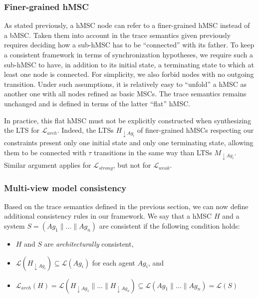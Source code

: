 \subsubsection*{Finer-grained hMSC}

As stated previously, a hMSC node can refer to a finer-grained hMSC instead of a bMSC. Taken them into account in the trace semantics given previously requires deciding how a sub-hMSC has to be ``connected'' with its father. To keep a consistent framework in terms of synchronization hypotheses, we require such a sub-hMSC to have, in addition to its initial state, a terminating state to which at least one node is connected. For simplicity, we also forbid nodes with no outgoing transition. Under such assumptions, it is relatively easy to ``unfold'' a hMSC as another one with all nodes refined as basic MSCs. The trace semantics remains unchanged and is defined in terms of the latter ``flat'' hMSC. 

In practice, this flat hMSC must not be explicitly constructed when synthesizing the LTS for $\mathcal{L}_{arch}$. Indeed, the LTSs $H_{\downarrow Ag_i}$ of finer-grained hMSCs respecting our constraints present only one initial state and only one terminating state, allowing them to be connected with $\tau$ transitions in the same way than LTSs $M_{\downarrow Ag_i}$. Similar argument applies for $\mathcal{L}_{strong}$, but not for $\mathcal{L}_{weak}$.

\subsubsection*{Multi-view model consistency}
 
Based on the trace semantics defined in the previous section, we can now define additional consistency rules in our framework. We say that a hMSC $H$ and a system $S = (Ag_1 \parallel \ldots \parallel Ag_n)$ are consistent if the following condition holds:

\begin{itemize}
\item $H$ and $S$ are \emph{architecturally} consistent,
\item $\mathcal{L}(H_{\downarrow Ag_i}) \subseteq \mathcal{L}(Ag_i)$ for each agent $Ag_i$, and
\item $\mathcal{L}_{arch}(H) = \mathcal{L}(H_{\downarrow Ag_1} \parallel \ldots \parallel H_{\downarrow Ag_n}) \subseteq \mathcal{L}(Ag_1 \parallel \ldots \parallel Ag_n) = \mathcal{L}(S)$
\end{itemize}


